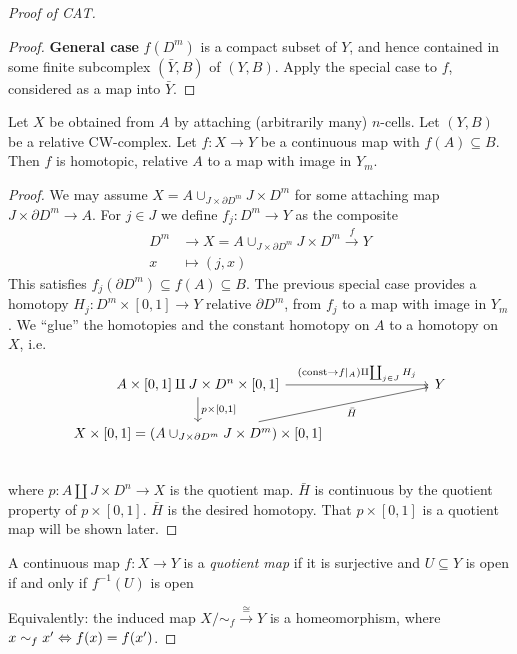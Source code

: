 \documentclass{TemplateLecture}
\begin{document}
\begin{proof}[Proof of CAT]
\begin{proof}
        \textbf{General case} \(f(D^m)\) is a compact subset of \(Y\), and hence contained in some finite subcomplex  \((\bar Y, B)\) of \((Y,B)\). Apply the special case to \(f\), considered as a map into \(\bar Y\).
    \end{proof}

    \begin{thm}{}{}
        Let \(X\) be obtained from \(A\) by attaching (arbitrarily many) \(n\)-cells. Let \((Y,B)\) be a relative CW-complex. Let \(f\colon X \to Y\) be a continuous map with \(f(A) \subseteq B\). Then \(f\) is homotopic, relative \(A\) to a map with image in \(Y_m\).
    \end{thm}
    \begin{proof}
        We may assume \(X = A \cup_{J\times \partial D^m} J\times D^m\) for some attaching map \(J\times \partial D^m \to A\). For \(j \in J\) we define \(f_j\colon D^m \to Y\) as the composite
        \[\begin{split}
            D^m &\to X = A\cup_{J\times \partial D^m} J\times D^m \xrightarrow{f} Y \\
            x &\mapsto (j,x)
        \end{split}\]
        This satisfies \(f_j(\partial D^m) \subseteq f(A) \subseteq B\).
        The previous special case provides a homotopy \(H_j\colon D^m \times [0,1] \to Y\) relative \(\partial D^m\), from \(f_j\) to a map with image in \(Y_m\).
        We \enquote{glue} the homotopies and the constant homotopy on \(A\) to a homotopy on \(X\), i.e.
        \[\begin{tikzcd}
            {A\times [0,1] \amalg J\times D^n \times [0,1]} \ar[rrr, "{(\const \to f\rvert_A) \amalg \coprod_{j\in J} H_j}"] \ar[d, "{p\times [0,1]}"] &&& Y \\
            {X\times [0,1] = (A\cup_{J\times \partial D^m} J\times D^m) \times [0,1]} \ar[rrru, "\bar H"'] &&& \\
        \end{tikzcd}\]
        where \(p\colon A\amalg J\times D^n \to X\) is the quotient map.
        \(\bar H\) is continuous by the quotient property of \(p\times [0,1]\). \(\bar{H}\) is the desired homotopy. That \(p\times [0,1]\) is a quotient map will be shown later.
    \end{proof}

    \begin{defi}
        A continuous map \(f\colon X\to Y\) is a \emph{quotient map} if it is surjective and \(U\subseteq Y\) is open if and only if \(f^{-1}(U)\) is open
    \end{defi}
    Equivalently: the induced map \(X/\sim_{f} \xrightarrow{\cong} Y\) is a homeomorphism, where \(x \sim_f x' \Leftrightarrow f(x) = f(x')\).


\end{proof}
\end{document}
